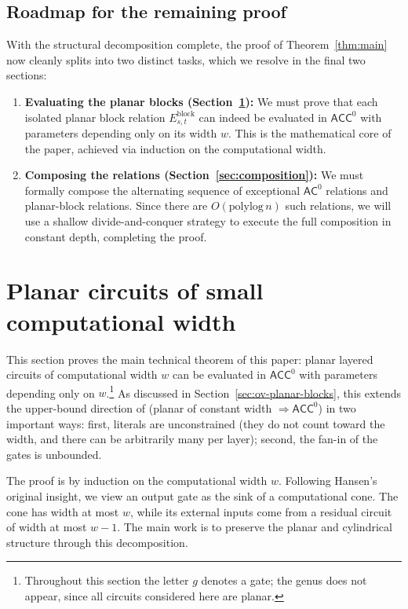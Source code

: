 \documentclass[11pt]{article}
\theoremstyle{definition}
\theoremstyle{remark}
\newcommand{\ACC}{\mathsf{ACC}^0}
\newcommand{\AC}{\mathsf{AC}^0}
\begin{document}
\subsection{Roadmap for the remaining proof}\label{sec:roadmap}
With the structural decomposition complete, the proof of Theorem~\ref{thm:main} now cleanly splits into two distinct tasks, which we resolve in the final two sections:
\begin{enumerate}
    \item \textbf{Evaluating the planar blocks (Section~\ref{sec:bridge}):} We must prove that each isolated planar block relation $E^{\mathrm{block}}_{s,t}$ can indeed be evaluated in $\ACC$ with parameters depending only on its width $w$. This is the mathematical core of the paper, achieved via induction on the computational width.
    \item \textbf{Composing the relations (Section~\ref{sec:composition}):} We must formally compose the alternating sequence of exceptional $\AC$ relations and planar-block relations. Since there are $O(\mathrm{polylog}\, n)$ such relations, we will use a shallow divide-and-conquer strategy to execute the full composition in constant depth, completing the proof.
\end{enumerate}
\section{Planar circuits of small computational width}\label{sec:bridge}

This section proves the main technical theorem of this paper: planar layered circuits of computational width $w$ can be evaluated in $\ACC$ with parameters depending only on $w$.\footnote{Throughout this section the letter $g$ denotes a gate; the genus does not appear, since all circuits considered here are planar.} As discussed in Section~\ref{sec:ov-planar-blocks}, this extends the upper-bound direction of \cite[Theorem~1]{Hansen03} (planar of constant width $\Rightarrow \ACC$) in two important ways: first, literals are unconstrained (they do not count toward the width, and there can be arbitrarily many per layer); second, the fan-in of the gates is unbounded.

The proof is by induction on the computational width $w$. Following Hansen's original insight, we view an output gate as the sink of a computational cone. The cone has width at most $w$, while its external inputs come from a residual circuit of width at most $w-1$. The main work is to preserve the planar and cylindrical structure through this decomposition.
\end{document}
